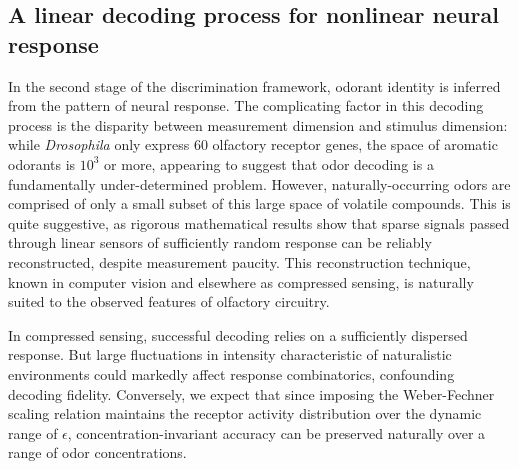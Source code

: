 \subsection*{A linear decoding process for nonlinear neural response}

In the second stage of the discrimination framework, odorant identity is inferred from the pattern of neural response. The complicating factor in this decoding process is the disparity between measurement dimension and stimulus dimension: while \textit{Drosophila} only express 60 olfactory receptor genes, the space of aromatic odorants is $10^3$ or more, appearing to suggest that odor decoding is a fundamentally under-determined problem. However, naturally-occurring odors are comprised of only a small subset of this large space of volatile compounds. This is quite suggestive, as rigorous mathematical results show that sparse signals passed through linear sensors of sufficiently random response can be reliably reconstructed, despite measurement paucity. %
This reconstruction technique, known in computer vision and elsewhere as compressed sensing, is naturally suited to the observed features of olfactory circuitry. %

In compressed sensing, successful decoding relies on a sufficiently dispersed response. But large fluctuations in intensity characteristic of naturalistic environments could markedly affect response combinatorics, confounding decoding fidelity. Conversely, we expect that since imposing the Weber-Fechner scaling relation maintains the receptor activity distribution over the dynamic range of $\epsilon$, concentration-invariant accuracy can be preserved naturally over a range of odor concentrations.

